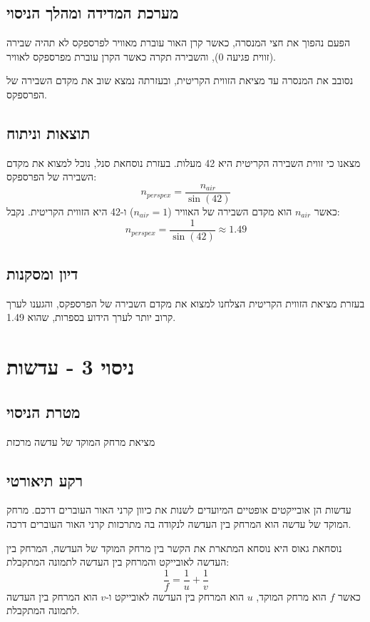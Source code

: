 \documentclass[14pt]{extarticle}
\begin{document}
\subsection*{מערכת המדידה ומהלך הניסוי}

הפעם נהפוך את חצי המנסרה, כאשר קרן האור עוברת מאוויר לפרספקס לא תהיה שבירה (זווית פגיעה 0), והשבירה תקרה כאשר הקרן עוברת מפרספקס לאוויר.

נסובב את המנסרה עד מציאת הזווית הקריטית, ובעזרתה נמצא שוב את מקדם השבירה של הפרספקס.

\subsection*{תוצאות וניתוח}
מצאנו כי זווית השבירה הקריטית היא 42 מעלות. בעזרת נוסחאת סנל, נוכל למצוא את מקדם השבירה של הפרספקס:
\begin{equation}
n_{perspex} = \frac{n_{air}}{\sin(42)}
\end{equation}
כאשר $n_{air}$ הוא מקדם השבירה של האוויר ($n_{air}=1$) ו-42 היא הזווית הקריטית. נקבל:
\begin{equation}
n_{perspex} = \frac{1}{\sin(42)} \approx 1.49
\end{equation}

\subsection*{דיון ומסקנות}
בעזרת מציאת הזווית הקריטית הצלחנו למצוא את מקדם השבירה של הפרספקס, והגענו לערך קרוב יותר לערך הידוע בספרות, שהוא 1.49.

\section*{ניסוי 3 - עדשות}
\subsection*{מטרת הניסוי}
מציאת מרחק המוקד של עדשה מרכזת
\subsection*{רקע תיאורטי}
עדשות הן אובייקטים אופטיים המיועדים לשנות את כיוון קרני האור העוברים דרכם.
מרחק המוקד של עדשה הוא המרחק בין העדשה לנקודה בה מתרכזות קרני האור העוברים דרכה.

נוסחאת גאוס היא נוסחא המתארת את הקשר בין מרחק המוקד של העדשה, המרחק בין העדשה לאובייקט והמרחק בין העדשה לתמונה המתקבלת:
\begin{equation}
\frac{1}{f} = \frac{1}{u} + \frac{1}{v}
\end{equation}
כאשר $f$ הוא מרחק המוקד, $u$ הוא המרחק בין העדשה לאובייקט ו-$v$ הוא המרחק בין העדשה לתמונה המתקבלת.
\end{document}
